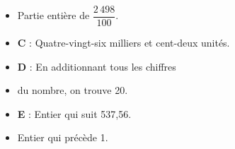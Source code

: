\begin{enigme}
\begin{multicols}{2}
\begin{itemize}
\begin{spacing}{1.2}
\begin{itemize}
                    \item[] Partie entière de $\dfrac{2\,498}{100}$.
                    \item[] {\bf C} : Quatre-vingt-six milliers et cent-deux unités.
                    \item[] {\bf D} : En additionnant tous les chiffres
                    \item[] du nombre, on trouve 20.
                    \item[] {\bf E} : Entier qui suit 537,56.
                    \item[] Entier qui précède 1.
                \end{itemize}
            \end{spacing}
        \end{itemize}
     \end{multicols}
\end{enigme}
\addtocounter{exercice}{-1}
